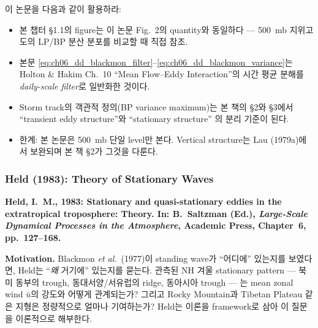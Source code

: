 \begin{hisublock}
이 논문을 다음과 같이 활용하라:
\begin{itemize}
  \item 본 챕터 \S1.1의 figure는 이 논문 Fig.~2의 quantity와 동일하다 ---
        500~mb 지위고도의 LP/BP 분산 분포를 비교할 때 직접 참조.
  \item 본문 \eqref{eq:ch06_dd_blackmon_filter}--\eqref{eq:ch06_dd_blackmon_variance}는
        Holton \& Hakim Ch.~10 ``Mean Flow--Eddy Interaction''의 시간 평균 분해를
        \emph{daily-scale filter}로 일반화한 것이다.
  \item Storm track의 객관적 정의(BP variance maximum)는 본 책의 \S2와 \S3에서
        ``transient eddy structure''와 ``stationary structure'' 의 분리 기준이 된다.
  \item 한계: 본 논문은 500~mb 단일 level만 본다. Vertical structure는
        Lau (1979a)에서 보완되며 본 책 \S2가 그것을 다룬다.
\end{itemize}
\end{hisublock}


\subsubsection{Held (1983): Theory of Stationary Waves}

\textbf{Held, I.~M., 1983: Stationary and quasi-stationary eddies in the extratropical troposphere: Theory.
In: B.~Saltzman (Ed.), \emph{Large-Scale Dynamical Processes in the Atmosphere},
Academic Press, Chapter~6, pp.~127--168.}

\medskip
\noindent\textbf{Motivation.}\quad
Blackmon \emph{et al.}\ (1977)이 standing wave가 ``어디에'' 있는지를 보였다면,
Held는 ``\emph{왜} 거기에'' 있는지를 묻는다.  관측된 NH 겨울 stationary pattern ---
북미 동부의 trough, 동대서양/서유럽의 ridge, 동아시아 trough ---
는 mean zonal wind $\bar u$의 강도와 어떻게 관계되는가?
그리고 Rocky Mountain과 Tibetan Plateau 같은 지형은 정량적으로 얼마나 기여하는가?
Held는  이론을 framework로 삼아 이 질문을
이론적으로 해부한다.

